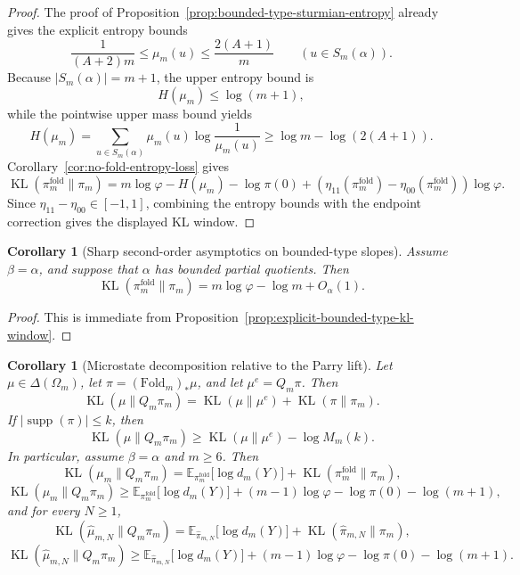 \documentclass[11pt,letterpaper]{article}
\numberwithin{equation}{section}
\theoremstyle{plain}
\newtheorem{corollary}[theorem]{Corollary}
\theoremstyle{definition}
\theoremstyle{remark}
\newcommand{\Fold}{\mathrm{Fold}}
\DeclareMathOperator{\KL}{KL}
\DeclareMathOperator{\supp}{supp}
\begin{document}
\begin{proof}
The proof of Proposition~\ref{prop:bounded-type-sturmian-entropy} already gives
the explicit entropy bounds
\[
\frac{1}{(A+2)m}\le \mu_m(u)\le \frac{2(A+1)}{m}
\qquad (u\in S_m(\alpha)).
\]
Because \(|S_m(\alpha)|=m+1\), the upper entropy bound is
\[
H(\mu_m)\le \log(m+1),
\]
while the pointwise upper mass bound yields
\[
H(\mu_m)
=
\sum_{u\in S_m(\alpha)}\mu_m(u)\log\frac1{\mu_m(u)}
\ge
\log m-\log(2(A+1)).
\]
Corollary~\ref{cor:no-fold-entropy-loss} gives
\[
\KL(\pi_m^{\mathrm{fold}}\|\pi_m)
=
m\log\varphi-H(\mu_m)-\log\pi(0)
+(\eta_{11}(\pi_m^{\mathrm{fold}})-\eta_{00}(\pi_m^{\mathrm{fold}}))\log\varphi.
\]
Since \(\eta_{11}-\eta_{00}\in[-1,1]\), combining the entropy bounds with the
endpoint correction gives the displayed KL window.
\end{proof}

\begin{corollary}[Sharp second-order asymptotics on bounded-type slopes]\label{cor:sharp-second-order-bounded-type}
Assume \(\beta=\alpha\), and suppose that \(\alpha\) has bounded partial
quotients. Then
\[
\KL(\pi_m^{\mathrm{fold}}\|\pi_m)
=
m\log\varphi-\log m+O_\alpha(1).
\]
\end{corollary}

\begin{proof}
This is immediate from Proposition~\ref{prop:explicit-bounded-type-kl-window}.
\end{proof}

\begin{corollary}[Microstate decomposition relative to the Parry lift]\label{cor:microstate-parry-lift-decomposition}
Let \(\mu\in\Delta(\Omega_m)\), let \(\pi=(\Fold_m)_*\mu\), and let
\(\mu^e=Q_m\pi\). Then
\[
\KL(\mu\|Q_m\pi_m)
=
\KL(\mu\|\mu^e)+\KL(\pi\|\pi_m).
\]
If \(|\supp(\pi)|\le k\), then
\[
\KL(\mu\|Q_m\pi_m)
\ge
\KL(\mu\|\mu^e)-\log M_m(k).
\]
In particular, assume \(\beta=\alpha\) and \(m\ge 6\). Then
\[
\KL(\mu_m\|Q_m\pi_m)
=
\mathbb E_{\pi_m^{\mathrm{fold}}}\big[\log d_m(Y)\big]
+\KL(\pi_m^{\mathrm{fold}}\|\pi_m),
\]
\[
\KL(\mu_m\|Q_m\pi_m)
\ge
\mathbb E_{\pi_m^{\mathrm{fold}}}\big[\log d_m(Y)\big]
+(m-1)\log\varphi-\log\pi(0)-\log(m+1),
\]
and for every \(N\ge 1\),
\[
\KL(\hat\mu_{m,N}\|Q_m\pi_m)
=
\mathbb E_{\hat\pi_{m,N}}\big[\log d_m(Y)\big]
+\KL(\hat\pi_{m,N}\|\pi_m),
\]
\[
\KL(\hat\mu_{m,N}\|Q_m\pi_m)
\ge
\mathbb E_{\hat\pi_{m,N}}\big[\log d_m(Y)\big]
+(m-1)\log\varphi-\log\pi(0)-\log(m+1).
\]
\end{corollary}
\end{document}
